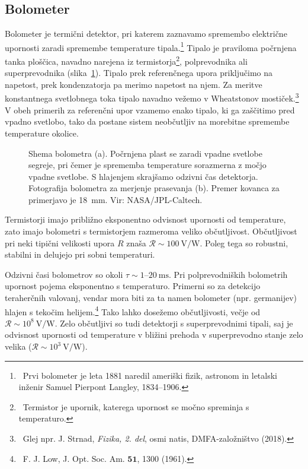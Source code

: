 \subsection*{Bolometer}
Bolometer je termični detektor, pri katerem zaznavamo spremembo 
električne upornosti
zaradi spremembe temperature tipala.\footnote{~Prvi bolometer je leta 1881 naredil
ameriški fizik, astronom in letalski inženir Samuel Pierpont Langley, 1834--1906.}
Tipalo je praviloma počrnjena tanka ploščica, 
navadno narejena iz termistorja\footnote{~Termistor je upornik, katerega
upornost se močno spreminja s temperaturo.},  polprevodnika ali superprevodnika 
(slika~\ref{fig:Bolometer-shema}). Tipalo prek
referenčnega upora priključimo na napetost, prek kondenzatorja pa merimo napetost na njem.
Za meritve konstantnega svetlobnega toka tipalo navadno vežemo v Wheatstonov mostiček.\footnote{~Glej
npr. J. Strnad, {\it Fizika, 2. del}, osmi natis, DMFA-založništvo (2018).} V obeh
primerih za referenčni upor vzamemo enako tipalo, ki ga zaščitimo pred vpadno svetlobo, 
tako da postane sistem neobčutljiv na morebitne spremembe temperature okolice.
\begin{figure}[ht]
\centering
\def\svgwidth{140truemm} 

\caption{Shema bolometra (a). Počrnjena plast se zaradi vpadne svetlobe segreje, pri čemer
je sprememba temperature sorazmerna z močjo vpadne svetlobe. S hlajenjem skrajšamo odzivni čas
detektorja. Fotografija bolometra za merjenje prasevanja (b). 
Premer kovanca za primerjavo je 18~mm. 
Vir: NASA/JPL-Caltech.}
\label{fig:Bolometer-shema}
\end{figure}

Termistorji imajo približno eksponentno odvisnost upornosti od temperature, zato imajo bolometri
s termistorjem razmeroma veliko občutljivost. Občutljivost pri neki tipični
velikosti upora $R$ znaša $\mathcal{R}\sim 100~\si{\volt/\watt}$. Poleg tega so 
robustni, stabilni in delujejo pri sobni temperaturi. 

Odzivni časi bolometrov so okoli 
$\tau \sim 1$--$20~\si{\milli\second}$. 
Pri polprevodniških bolometrih upornost pojema eksponentno s temperaturo. 
Primerni so za detekcijo teraherčnih valovanj, 
vendar mora biti za ta namen bolometer (npr. germanijev) hlajen s tekočim helijem.\footnote{~F. J. 
Low, J. Opt. Soc. Am. $\mathbf{51}$, 1300 (1961).}  
Tako lahko dosežemo občutljivosti, večje od $\mathcal{R} \sim 10^8~\si{\volt/\watt}$. Zelo 
občutljivi so tudi detektorji s superprevodnimi tipali, saj je odvisnost upornosti 
od temperature v bližini prehoda v superprevodno stanje zelo velika 
($\mathcal{R} \sim 10^3~\si{\volt/\watt}$).

